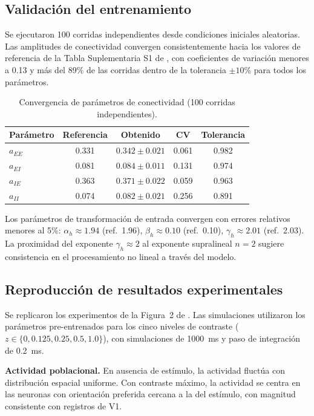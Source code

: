\documentclass[spanish,a4paper,11pt]{article}
\begin{document}
\subsection{Validación del entrenamiento}

Se ejecutaron 100 corridas independientes desde condiciones iniciales aleatorias. Las amplitudes de conectividad convergen consistentemente hacia los valores de referencia de la Tabla Suplementaria S1 de \citet{echeveste2020cortical}, con coeficientes de variación menores a 0.13 y más del 89\% de las corridas dentro de la tolerancia $\pm 10\%$ para todos los parámetros.

\begin{table}[H]
\centering
\caption{Convergencia de parámetros de conectividad (100 corridas independientes).}
\label{tab:connectivity}
\begin{tabular}{lcccc}
\toprule
\textbf{Parámetro} & \textbf{Referencia} & \textbf{Obtenido} & \textbf{CV} & \textbf{Tolerancia} \\
\midrule
$a_{EE}$ & 0.331 & $0.342 \pm 0.021$ & 0.061 & 0.982 \\
$a_{EI}$ & 0.081 & $0.084 \pm 0.011$ & 0.131 & 0.974 \\
$a_{IE}$ & 0.363 & $0.371 \pm 0.022$ & 0.059 & 0.963 \\
$a_{II}$ & 0.074 & $0.082 \pm 0.021$ & 0.256 & 0.891 \\
\bottomrule
\end{tabular}
\end{table}

Los parámetros de transformación de entrada convergen con errores relativos menores al 5\%: $\alpha_h \approx 1.94$ (ref.\ 1.96), $\beta_h \approx 0.10$ (ref.\ 0.10), $\gamma_h \approx 2.01$ (ref.\ 2.03). La proximidad del exponente $\gamma_h \approx 2$ al exponente supralineal $n = 2$ sugiere consistencia en el procesamiento no lineal a través del modelo.

\subsection{Reproducción de resultados experimentales}

Se replicaron los experimentos de la Figura~2 de \citet{echeveste2020cortical}. Las simulaciones utilizaron los parámetros pre-entrenados para los cinco niveles de contraste ($z \in \{0, 0.125, 0.25, 0.5, 1.0\}$), con simulaciones de 1000~ms y paso de integración de 0.2~ms.

\textbf{Actividad poblacional.} En ausencia de estímulo, la actividad fluctúa con distribución espacial uniforme. Con contraste máximo, la actividad se centra en las neuronas con orientación preferida cercana a la del estímulo, con magnitud consistente con registros de V1.
\end{document}
